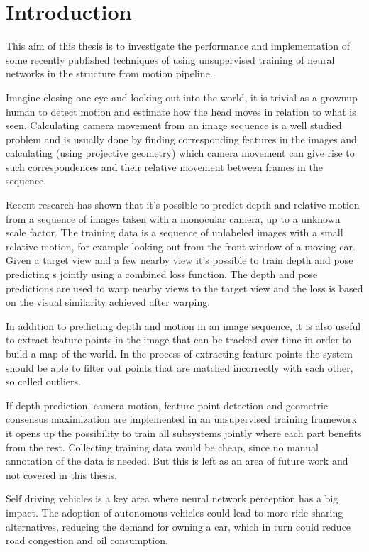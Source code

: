 \chapter{Introduction}\label{cha:introduction}

This aim of this thesis is to investigate the performance and implementation of some recently published techniques of using unsupervised training of neural networks in the structure from motion pipeline. 

Imagine closing one eye and looking out into the world, it is trivial as a grownup human to detect motion and estimate how the head moves in relation to what is seen. Calculating camera movement from an image sequence is a well studied problem and is usually done by finding corresponding features in the images and calculating (using projective geometry) which camera movement can give rise to such correspondences and their relative movement between frames in the sequence.

Recent research has shown that it's possible to predict depth and relative motion from a sequence of images taken with a monocular \abbrRGB camera, up to a unknown scale factor. The training data is a sequence of unlabeled images with a small relative motion, for example looking out from the front window of a moving car. Given a target view and a few nearby view it's possible to train depth and pose predicting \abbrCNN{}s jointly using a combined loss function. The depth and pose predictions are used to warp nearby views to the target view and the loss is based on the visual similarity achieved after warping.

In addition to predicting depth and motion in an image sequence, it is also useful to extract feature points in the image that can be tracked over time in order to build a map of the world. In the process of extracting feature points the system should be able to filter out points that are matched incorrectly with each other, so called outliers.

If depth prediction, camera motion, feature point detection and geometric consensus maximization are implemented in an unsupervised training framework it opens up the possibility to train all subsystems jointly where each part benefits from the rest. Collecting training data would be cheap, since no manual annotation of the data is needed. But this is left as an area of future work and not covered in this thesis.

Self driving vehicles is a key area where neural network perception has a big impact. The adoption of autonomous vehicles could lead to more ride sharing alternatives, reducing the demand for owning a car, which in turn could reduce road congestion and oil consumption. \cite{transportation}

